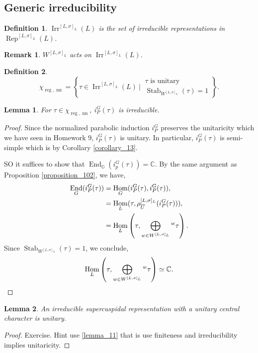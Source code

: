 \documentclass[8pt]{article}
\newtheorem{definition}{Definition}[section]
\newtheorem{lemma}{Lemma}[section]
\newtheorem{remark}{Remark}[section]
\DeclareMathOperator{\Stab}{Stab}
\DeclareMathOperator{\Rep}{Rep}
\DeclareMathOperator{\Hom}{Hom}
\DeclareMathOperator{\End}{End}
\DeclareMathOperator{\Irr}{Irr}
\DeclareMathOperator{\nn}{nn}
\DeclareMathOperator{\reg}{reg}
\newcommand{\C}[0]{\mathbb{C}}
\newcommand{\G}[0]{\mathbb{G}}
\newcommand{\sep}[0]{\:|\:}
\begin{document}
\subsection{Generic irreducibility}
\begin{definition}
  $\Irr^{[L,\sigma]_L}(L)$ is the set of irreducible representations in $\Rep^{[L,\sigma]_L}(L)$.
\end{definition}
\begin{remark}
  $W^{[L,\sigma]_L}$ acts on $\Irr^{[L,\sigma]_L}(L)$.
\end{remark}
\begin{definition}
  \begin{equation*}
    \chi_{\reg,\nn} = \left\{\tau\in\Irr^{[L,\sigma]_L}(L)\sep\substack{\text{$\tau$ is unitary}\\\text{$\Stab_{W^{[L,\sigma]_L}}(\tau)=1$}}\right\}.
  \end{equation*}
\end{definition}
\begin{lemma}
  \label{lemma_104}
  For $\tau\in\chi_{\reg,\nn}$, $i_P^G(\tau)$ is irreducible.
\end{lemma}
\begin{proof}
  Since the normalized parabolic induction $i_P^G$ preserves the unitaricity which we have seen in Homework 9, $i_P^G(\tau)$ is unitary. 
  In particular, $i_P^G(\tau)$ is semi-simple which is by Corollary \ref{corollary_13}.
  \par SO it suffices to show that $\End_\G(i_p^G(\tau))=\C$. By the same argument as Proposition \ref{proposition_102}, we have,
  \begin{align*}
    \End_G(i_P^G(\tau)) & = \Hom_G(i_P^G(\tau),i_P^G(\tau)),\\
    & = \Hom_L(\tau,\rho_{\overline{U}}^{[L,\sigma]_L}(i_P^G(\tau))),\\
    &=\Hom_L\left(\tau,\bigoplus_{w\in W^{[L,\sigma]_L}}\prescript{w}{}{\tau}\right).
  \end{align*}
  Since $\Stab_{W^{[L,\sigma]_L}}(\tau)=1$, we conclude,
  \begin{equation*}
    \Hom_L\left(\tau,\bigoplus_{w\in W^{[L,\sigma]_L}}\prescript{w}{}{\tau}\right)\simeq\C.
  \end{equation*}
\end{proof}
\begin{lemma}
  An irreducible supercuspidal representation with a unitary central character is unitary.
  \label{lemma_105_1}
\end{lemma}
\begin{proof}
  Exercise. Hint use \ref{lemma_11} that is use finiteness and irreducibility implies unitaricity.
\end{proof}
\end{document}
